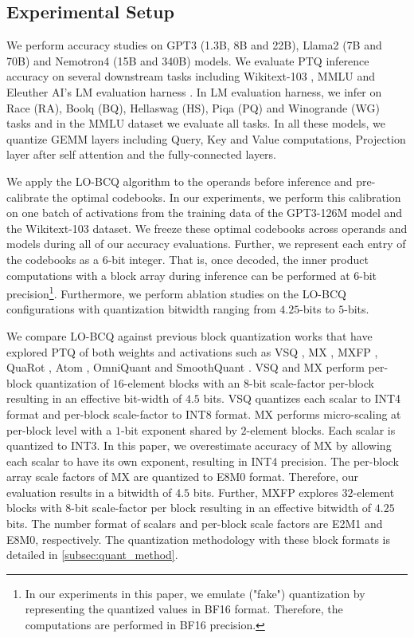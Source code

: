 \subsection{Experimental Setup}
\vspace{-0.3em}
We perform accuracy studies on GPT3 \citep{shoeybi2020megatronlm} (1.3B, 8B and 22B), Llama2 \citep{touvron2023llama2openfoundation} (7B and 70B) and Nemotron4 (15B and 340B) \citep{nemotron} models. We evaluate PTQ inference accuracy on several downstream tasks including Wikitext-103 \citep{merity2016pointer}, MMLU \citep{hendrycks2021measuringmassivemultitasklanguage} and Eleuther AI's LM evaluation harness \citep{eval-harness}. In LM evaluation harness, we infer on Race (RA), Boolq (BQ), Hellaswag (HS), Piqa (PQ) and Winogrande (WG) tasks and in the MMLU dataset we evaluate all tasks. In all these models, we quantize GEMM layers including Query, Key and Value computations, Projection layer after self attention and the fully-connected layers.

We apply the LO-BCQ algorithm to the operands before inference and pre-calibrate the optimal codebooks. In our experiments, we perform this calibration on one batch of activations from the training data of the GPT3-126M model and the Wikitext-103 dataset. We freeze these optimal codebooks across operands and models during all of our accuracy evaluations. Further, we represent each entry of the codebooks as a $6$-bit integer. That is, once decoded, the inner product computations with a block array during inference can be performed at $6$-bit precision\footnote{In our experiments in this paper, we emulate ("fake") quantization by representing the quantized values in BF16 format. Therefore, the computations are performed in BF16 precision.}. Furthermore, we perform ablation studies on the LO-BCQ configurations with quantization bitwidth ranging from $4.25$-bits to $5$-bits. 

We compare LO-BCQ against previous block quantization works that have explored PTQ of both weights and activations such as VSQ \citep{dai2021vsq}, MX \citep{rouhani2023microscaling}, MXFP \citep{rouhani2023shared}, QuaRot \citep{ashkboos2024quarot}, Atom \citep{zhao2024atom}, OmniQuant \citep{shao2024omniquant} and SmoothQuant \citep{xiao2023smoothquant}. VSQ and MX perform per-block quantization of $16$-element blocks with an $8$-bit scale-factor per-block resulting in an effective bit-width of $4.5$ bits. VSQ quantizes each scalar to INT4 format and per-block scale-factor to INT8 format. MX performs micro-scaling at per-block level with a $1$-bit exponent shared by $2$-element blocks. Each scalar is quantized to INT3. In this paper, we overestimate accuracy of MX by allowing each scalar to have its own exponent, resulting in INT4 precision. The per-block array scale factors of MX are quantized to E8M0 format. Therefore, our evaluation results in a bitwidth of $4.5$ bits. Further, MXFP explores $32$-element blocks with $8$-bit scale-factor per block resulting in an effective bitwidth of $4.25$ bits. The number format of scalars and per-block scale factors are E2M1 and E8M0, respectively. The quantization methodology with these block formats is detailed in \ref{subsec:quant_method}. 

